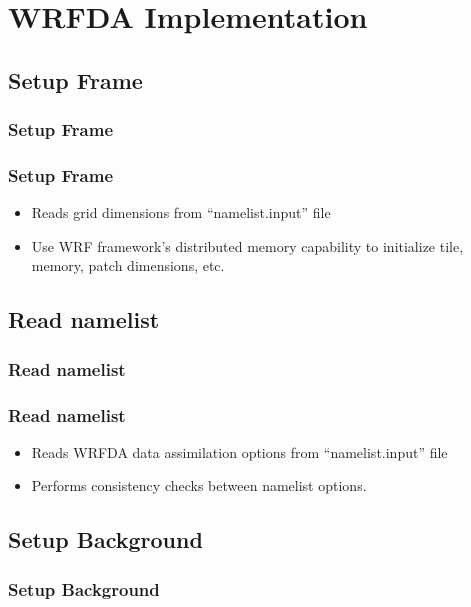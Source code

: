 \documentclass{beamer}
\begin{document}
\section{WRFDA Implementation}


\subsection{Setup Frame}
\begin{frame}
\frametitle{Setup Frame}
\end{frame}

\begin{frame}
\frametitle{Setup Frame}
\begin{itemize}
\item Reads grid dimensions from “namelist.input” file \pause
\item Use WRF framework’s distributed memory capability to initialize tile, memory, patch dimensions, etc.
\end{itemize}
\end{frame}

\subsection{Read namelist}
\begin{frame}
\frametitle{Read namelist}
\end{frame}

\begin{frame}
\frametitle{Read namelist}
\begin{itemize}
\item Reads WRFDA data assimilation options from “namelist.input” file\pause
\item Performs consistency checks between namelist options.
\end{itemize}
\end{frame}

\subsection{Setup Background}
\begin{frame}
\frametitle{Setup Background}
\end{frame}
\end{document}
